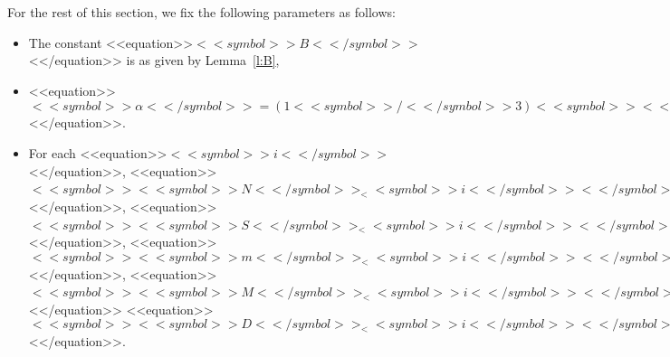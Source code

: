\documentclass[proceedings]{stacs}
\begin{document}
For the rest of this section, we fix the following parameters as follows:
\begin{itemize}
\item The constant <<equation>>$<<symbol>>B<</symbol>>$<</equation>> is as given by Lemma~\ref{l:B},
\item <<equation>>$<<symbol>>\alpha <</symbol>>= (1<<symbol>>/<</symbol>>3) <<symbol>><<symbol>>\epsilon<</symbol>><</symbol>>^2 \cdot(0.97<<symbol>>\tau<</symbol>>) \cdot (1<<symbol>>/<<symbol>><</symbol>>B<</symbol>>)$<</equation>>.

\item For each <<equation>>$<<symbol>>i<</symbol>>$<</equation>>, 
<<equation>>$<<symbol>><<symbol>>N<</symbol>>_<<symbol>>i<</symbol>><</symbol>> = 2^{<<symbol>><<symbol>><<symbol>>n<</symbol>>_<<symbol>>i<</symbol>><</symbol>><</symbol>>}$<</equation>>,
<<equation>>$<<symbol>><<symbol>>S<</symbol>>_<<symbol>>i<</symbol>><</symbol>> = 2^{(0.98<<symbol>><<symbol>>\tau<</symbol>>)\cdot <<symbol>><<symbol>>n<</symbol>>_<<symbol>>i<</symbol>><</symbol>><</symbol>>}$<</equation>>,
<<equation>>$<<symbol>><<symbol>>m<</symbol>>_<<symbol>>i<</symbol>><</symbol>> = (0.97 <<symbol>>\tau<</symbol>>) \cdot <<symbol>><<symbol>>n<</symbol>>_<<symbol>>i<</symbol>><</symbol>>$<</equation>>,
<<equation>>$<<symbol>><<symbol>>M<</symbol>>_<<symbol>>i<</symbol>><</symbol>> = 2^{<<symbol>><<symbol>><<symbol>>m<</symbol>>_<<symbol>>i<</symbol>><</symbol>><</symbol>>}$<</equation>>
<<equation>>$<<symbol>><<symbol>>D<</symbol>>_<<symbol>>i<</symbol>><</symbol>> = <<symbol>><<symbol>>M<</symbol>>_<<symbol>>i<</symbol>><</symbol>>$<</equation>>.
\end{itemize}
\end{document}
